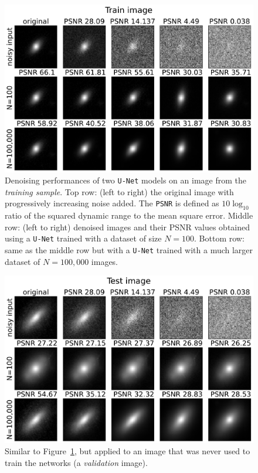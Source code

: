 \documentclass[fleqn,usenatbib]{mnras}
\begin{document}
\begin{figure}
    \centering
    \includegraphics[width=0.95\linewidth]{fig-UNet_denoising_perf_train.pdf}
    \caption{Denoising performances of two \texttt{U-Net} models on an image from the \textit{training sample}. 
    Top row: (left to right) the original image with progressively increasing noise added. The \texttt{PSNR} is defined as $10\log_{10}$ ratio of the squared dynamic range to the mean square error. 
    Middle row: (left to right) denoised images and their PSNR values obtained using a \texttt{U-Net} trained with a dataset of size $N=100$. 
    Bottom row: same as the middle row but with a \texttt{U-Net} trained with a much larger dataset of $N=100,000$ images.}
    \label{fig-UNet-denoising-train}
\end{figure}
\begin{figure}
    \centering
    \includegraphics[width=0.95\linewidth]{fig-UNet_denoising_perf_test.pdf}
    \caption{Similar to Figure~\ref{fig-UNet-denoising-train}, but applied to an image that was never used to train the networks (a \textit{validation} image).}
    \label{fig-UNet-denoising-test}
\end{figure}
\end{document}
